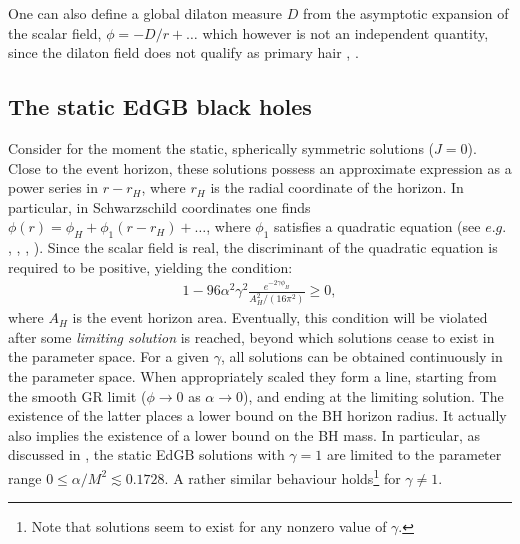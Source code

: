 \documentclass[12pt]{article}
\begin{document}
One can also define a global dilaton measure $D$ from the asymptotic expansion 
of the scalar field, $\phi=-D/r+\dots$ which however is not an independent quantity, 
since the dilaton field does not qualify as primary hair 
\cite{Kanti:1995vq}, \cite{Kleihaus:2015aje}.

\subsection{The static EdGB black holes}


Consider for the moment the static, spherically symmetric solutions ($J=0$). 
Close to the event horizon, these solutions possess an approximate expression  
as a power series in $r-r_H$, where 
$r_H$
 is the radial coordinate of the horizon. 
{ In particular, in Schwarzschild
coordinates one finds
$\phi(r)=\phi_H+\phi_1(r-r_H)+\dots$, where $\phi_1$ satisfies a quadratic equation
(see $e.g.$ \cite{Kanti:1995vq}, 
\cite{Torii:1996yi},
\cite{Alexeev:1996vs},
\cite{Kleihaus:2015aje}).
Since the scalar field is real,} the discriminant of the quadratic equation is required to be positive, yielding the condition:
 \begin{eqnarray}
 \label{cond1}
 1-96\alpha^2\gamma^2\frac{e^{-2\gamma \phi_H}}{A_H^2/(16\pi^2)} \geq 0,
 \end{eqnarray}  
%
where $A_H$ is the event horizon area. Eventually, this condition will be violated after some \textit{limiting solution} is reached, beyond which solutions cease to exist in the parameter space. 
For a given $\gamma$, all solutions can be obtained continuously in the parameter space. 
When appropriately scaled they
form a line, starting from the smooth GR limit ($\phi\to 0$ as $\alpha \to 0$), and ending at the limiting solution. 
The existence of the latter places a lower bound on the BH horizon radius. 
It actually also implies the existence of a lower bound on the
BH mass. In particular, as discussed in \cite{Kanti:1995vq,Pani:2009wy}, the static EdGB solutions with $\gamma=1$ are limited to the parameter range $0\leq\alpha/M^2\lesssim 0.1728$. A rather similar behaviour holds\footnote{Note that solutions seem to exist for any nonzero value of $\gamma$.} for  $\gamma\neq 1$. 
\end{document}
